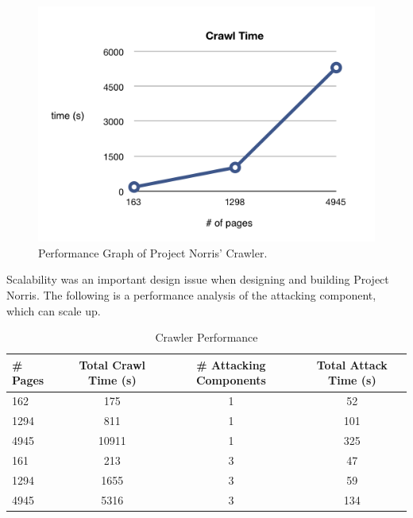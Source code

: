 \documentclass[12pt,a4paper]{article}
\begin{document}
\begin{figure}[!ht]
    \begin{center}
        \includegraphics[scale=0.6]{images/crawl_performance.png}    
    \end{center}
    \caption{Performance Graph of Project Norris' Crawler.}
    \label{fig:performance}
\end{figure}

Scalability was an important design issue when designing and building Project Norris.  The following is a performance analysis of the attacking component, which can scale up.

\begin{center}
    \begin{table}
        \caption{Crawler Performance}
        \begin{center}
            \begin{tabular}{ | l | c | c | c | }
                \hline
                \# Pages & Total Crawl Time (s) & \# Attacking Components & Total Attack Time (s)  \\ \hline
                162 & 175 & 1 & 52 \\ \hline
                1294 & 811 & 1 & 101 \\ \hline
                4945 & 10911 & 1 & 325 \\ \hline
                161 & 213 & 3 & 47 \\ \hline
                1294 & 1655 & 3 & 59 \\ \hline
                4945 & 5316 & 3 & 134 \\
                \hline
            \end{tabular}
        \end{center}
        \label{table:scalability}
    \end{table}
\end{center}
\end{document}
